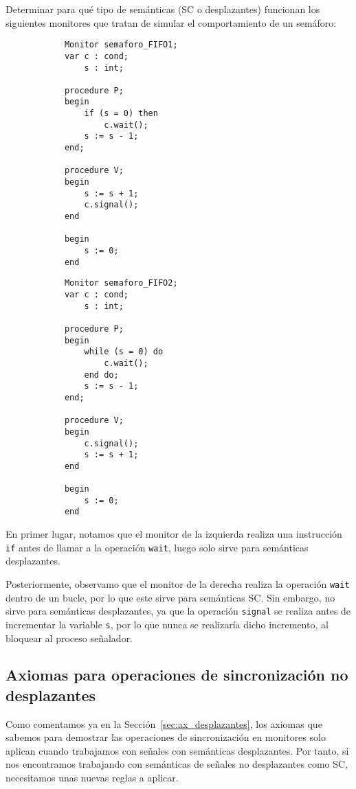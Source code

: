 \begin{ejercicio*}
    Determinar para qué tipo de semánticas (SC o desplazantes) funcionan los siguientes monitores que tratan de simular el comportamiento de un semáforo:
    \setlength{\columnsep}{1cm}
    \begin{multicols}{2}
        \begin{verbatim}
            Monitor semaforo_FIFO1;
            var c : cond;
                s : int;

            procedure P;
            begin
                if (s = 0) then
                    c.wait();
                s := s - 1;
            end;

            procedure V;
            begin
                s := s + 1;
                c.signal();
            end

            begin
                s := 0;
            end
        \end{verbatim}
        \begin{verbatim}
            Monitor semaforo_FIFO2;
            var c : cond;
                s : int;

            procedure P;
            begin
                while (s = 0) do
                    c.wait();
                end do;
                s := s - 1;
            end;

            procedure V;
            begin
                c.signal();
                s := s + 1;
            end

            begin
                s := 0;
            end
        \end{verbatim}
    \end{multicols}
    En primer lugar, notamos que el monitor de la izquierda realiza una instrucción \verb|if| antes de llamar a la operación \verb|wait|, luego solo sirve para semánticas desplazantes.

    Posteriormente, observamo que el monitor de la derecha realiza la operación \verb|wait| dentro de un bucle, por lo que este sirve para semánticas SC\@. Sin embargo, no sirve para semánticas desplazantes, ya que la operación \verb|signal| se realiza antes de incrementar la variable \verb|s|, por lo que nunca se realizaría dicho incremento, al bloquear al proceso señalador.
\end{ejercicio*}

\subsection{Axiomas para operaciones de sincronización no desplazantes}
Como comentamos ya en la Sección~\ref{sec:ax_desplazantes}, los axiomas que sabemos para demostrar las operaciones de sincronización en monitores solo aplican cuando trabajamos con señales con semánticas desplazantes. Por tanto, si nos encontramos trabajando con semánticas de señales no desplazantes como SC, necesitamos unas nuevas reglas a aplicar.

